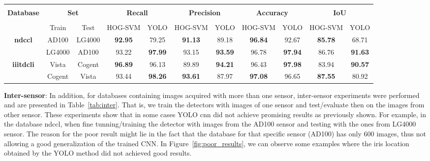 \documentclass[conference]{IEEEtran}
\begin{document}
\begin{table*}[!ht]
	\centering
	\caption{Inter-sensor results (\%)}
	\label{tab:inter}
	\begin{tabular}{c c c c c c c c c c c}\hline  \\[\dimexpr-\normalbaselineskip+4pt]

		 \multirow{2}{*}{\textbf{Database}} & \multicolumn{2}{c}{\textbf{Set}} & \multicolumn{2}{c}{\textbf{Recall}} & \multicolumn{2}{c}{\textbf{Precision}} & \multicolumn{2}{c}{\textbf{Accuracy}} & \multicolumn{2}{c}{\textbf{IoU}} \\
		 \\[\dimexpr-\normalbaselineskip+2pt] 
		 
		          & Train & Test & HOG-SVM & YOLO & HOG-SVM & YOLO & HOG-SVM & YOLO & HOG-SVM & YOLO \\ \toprule

		\multirow{2}{*}{\textbf{\gls*{ndccl}}}     & AD100 & LG4000  & \textbf{92.95}  & 79.25 & \textbf{91.13} & 89.18 & \textbf{96.84} & 92.67 & \textbf{85.78} & 68.71 \\ 
		                   & LG4000 & AD100  & 93.22  & \textbf{97.99} & 93.15 & \textbf{93.59} & 96.78 & \textbf{97.94} & 86.76 & \textbf{91.63}  \\ \midrule
		\multirow{2}{*}{\textbf{\gls*{iiitdcli}}} & Vista & Cogent  & \textbf{96.89}  & 96.13 & 89.89 & \textbf{94.21} & 96.43 & \textbf{97.98} & 83.94 & \textbf{90.57} \\ 
		                   & Cogent & Vista  & 93.44  & \textbf{98.26} & \textbf{93.61} & 87.97 & \textbf{97.08} & 96.65 & \textbf{87.55} & 80.92  \\ \bottomrule
	\end{tabular}
\end{table*}

\textbf{Inter-sensor}: 
In addition, for databases containing images acquired with more than one sensor, inter-sensor experiments were performed and are presented in Table~\ref{tab:inter}. 
That is, we train the detectors with images of one sensor and test/evaluate then on the images from other sensor.
These experiments show that in some cases YOLO \gls*{cnn} did not achieve promising results as previously shown.
For example, in the database \gls*{ndccl}, when fine tunning/training the detector with images from the AD100 sensor and testing with the ones from LG4000 sensor.
The reason for the poor result might lie in the fact that the database for that specific sensor (AD100) has only $600$ images, thus not allowing a good generalization of the trained CNN. 
In Figure~\ref{fig:poor_results}, we can observe some examples where the iris location obtained by the YOLO method did not achieved good results. 
\end{document}
